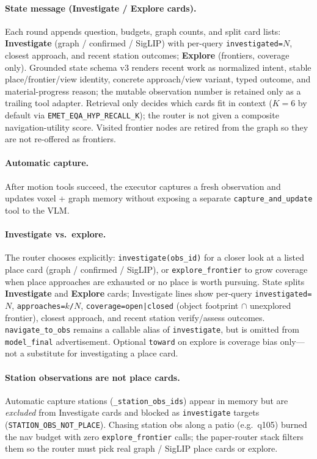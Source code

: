 \paragraph{State message (Investigate / Explore cards).}
Each round appends question, budgets, graph counts, and split card lists: \textbf{Investigate} (graph / confirmed / SigLIP) with per-query \texttt{investigated=$N$}, closest approach, and recent station outcomes; \textbf{Explore} (frontiers, coverage only). Grounded state schema v3 renders recent work as normalized intent, stable place/frontier/view identity, concrete approach/view variant, typed outcome, and material-progress reason; the mutable observation number is retained only as a trailing tool adapter.
Retrieval only decides which cards fit in context ($K{=}6$ by default via \texttt{EMET\_EQA\_HYP\_RECALL\_K}); the router is not given a composite navigation-utility score.
Visited frontier nodes are retired from the graph so they are not re-offered as frontiers.

\paragraph{Automatic capture.}
After motion tools succeed, the executor captures a fresh observation and updates voxel + graph memory without exposing a separate \texttt{capture\_and\_update} tool to the VLM.

\paragraph{Investigate vs.\ explore.}
The router chooses explicitly: \texttt{investigate(obs\_id)} for a closer look at a listed place card (graph / confirmed / SigLIP), or \texttt{explore\_frontier} to grow coverage when place approaches are exhausted or no place is worth pursuing.
State splits \textbf{Investigate} and \textbf{Explore} cards; Investigate lines show per-query \texttt{investigated=$N$}, \texttt{approaches=$k$/$N$}, \texttt{coverage=open|closed} (object footprint $\cap$ unexplored frontier), closest approach, and recent station verify/assess outcomes.
\texttt{navigate\_to\_obs} remains a callable alias of \texttt{investigate}, but is omitted from \texttt{model\_final} advertisement.
Optional \texttt{toward} on explore is coverage bias only---not a substitute for investigating a place card.

\paragraph{Station observations are not place cards.}
Automatic capture stations (\texttt{\_station\_obs\_ids}) appear in memory but are \emph{excluded} from Investigate cards and blocked as \texttt{investigate} targets (\texttt{STATION\_OBS\_NOT\_PLACE}).
Chasing station obs along a patio (e.g.\ q105) burned the nav budget with zero \texttt{explore\_frontier} calls; the paper-router stack filters them so the router must pick real graph / SigLIP place cards or explore.

